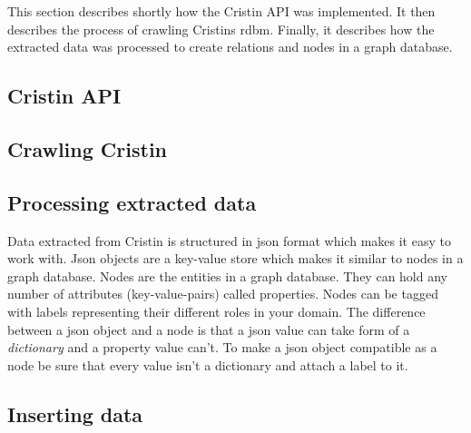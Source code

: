 This section describes shortly how the Cristin API was implemented. It then describes the process of crawling Cristins rdbm. Finally, it describes how the extracted data was processed to create relations and nodes in a graph database.

\subsection*{Cristin API}

\subsection*{Crawling Cristin}

\subsection*{Processing extracted data}
Data extracted from Cristin is structured in json format which makes it easy to work with. Json objects are a key-value store which makes it similar to nodes in a graph database. Nodes are the entities in a graph database. They can hold any number of attributes (key-value-pairs) called properties. Nodes can be tagged with labels representing their different roles in your domain.\cite{neo4j} The difference between a json object and a node is that a json value can take form of a \textit{dictionary} and a property value can't. To make a json object compatible as a node be sure that every value isn't a dictionary and attach a label to it.





\subsection*{Inserting data}
